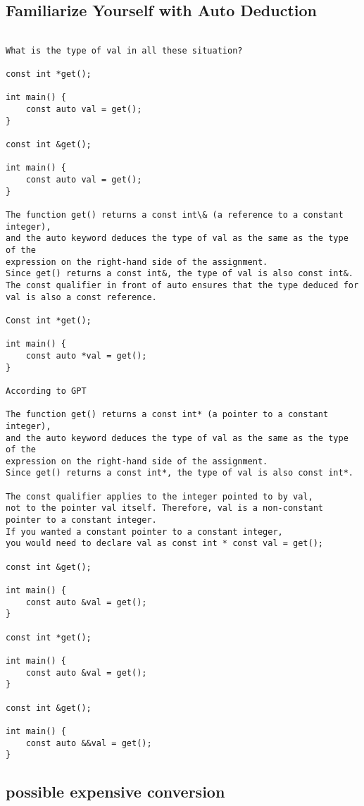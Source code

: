\subsection{Familiarize Yourself with Auto Deduction}

\begin{verbatim}

What is the type of val in all these situation?

const int *get();

int main() {
    const auto val = get();
}

const int &get();

int main() {
    const auto val = get();
}

The function get() returns a const int\& (a reference to a constant integer),
and the auto keyword deduces the type of val as the same as the type of the
expression on the right-hand side of the assignment.
Since get() returns a const int&, the type of val is also const int&.
The const qualifier in front of auto ensures that the type deduced for
val is also a const reference.

Const int *get();

int main() {
    const auto *val = get();
}

According to GPT

The function get() returns a const int* (a pointer to a constant integer),
and the auto keyword deduces the type of val as the same as the type of the
expression on the right-hand side of the assignment.
Since get() returns a const int*, the type of val is also const int*.

The const qualifier applies to the integer pointed to by val,
not to the pointer val itself. Therefore, val is a non-constant pointer to a constant integer.
If you wanted a constant pointer to a constant integer,
you would need to declare val as const int * const val = get();

const int &get();

int main() {
    const auto &val = get();
}

const int *get();

int main() {
    const auto &val = get();
}

const int &get();

int main() {
    const auto &&val = get();
}
\end{verbatim}

\subsection{possible expensive conversion}

